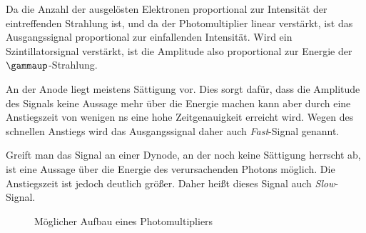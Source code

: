 \documentclass[11pt, ngerman, fleqn, DIV=15, headinclude, BCOR=2cm]{scrreprt}
\begin{document}
Da die Anzahl der ausgelösten Elektronen proportional zur Intensität der
eintreffenden Strahlung ist, und da der Photomultiplier linear verstärkt, ist
das Ausgangssignal proportional zur einfallenden Intensität. Wird ein
Szintillatorsignal verstärkt, ist die Amplitude also proportional zur Energie
der $\gammaup$-Strahlung.

An der Anode liegt meistens Sättigung vor. Dies sorgt dafür, dass die Amplitude
des Signals keine Aussage mehr über die Energie machen kann aber durch eine
Anstiegszeit von wenigen \si{\nano\second} eine hohe Zeitgenauigkeit erreicht
wird. Wegen des schnellen Anstiegs wird das Ausgangssignal daher auch
\emph{Fast}-Signal genannt.

Greift man das Signal an einer Dynode, an der noch keine Sättigung herrscht ab,
ist eine Aussage über die Energie des verursachenden Photons möglich. Die
Anstiegszeit ist jedoch deutlich größer. Daher heißt dieses Signal auch
\emph{Slow}-Signal.

\begin{figure}[htbp]
    \centering
    \caption{%
        Möglicher Aufbau eines Photomultipliers
    }
    \label{fig:PM}
\end{figure}
\end{document}
